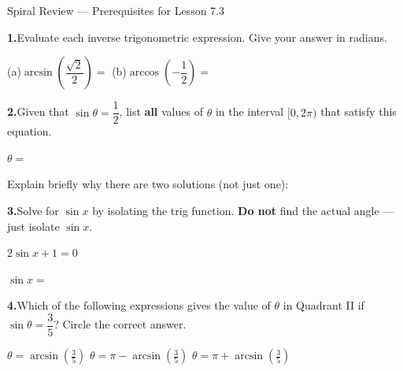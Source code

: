 \documentclass[10pt]{article}
\begin{document}
\namedateperiod

\vspace{0.10in}

\begin{notesbox}{Spiral Review --- Prerequisites for Lesson 7.3}

\textbf{1.}\quad Evaluate each inverse trigonometric expression.
Give your answer in radians.

\vspace{4pt}
(a)\quad $\arcsin\!\left(\dfrac{\sqrt{2}}{2}\right) = $ \blank{2.5cm}
\hspace{1cm}
(b)\quad $\arccos\!\left(-\dfrac{1}{2}\right) = $ \blank{2.5cm}

\vspace{0.14in}
\textbf{2.}\quad Given that $\sin\theta = \dfrac{1}{2}$, list \textbf{all}
values of $\theta$ in the interval $[0, 2\pi)$ that satisfy this equation.

\vspace{4pt}
$\theta = $ \blank{5cm}

\vspace{4pt}
Explain briefly why there are two solutions (not just one):

\vspace{0.14in}
\textbf{3.}\quad Solve for $\sin x$ by isolating the trig function.
\textbf{Do not} find the actual angle --- just isolate $\sin x$.

\vspace{4pt}
\hspace{1em}$2\sin x + 1 = 0$

\vspace{6pt}
$\sin x = $ \blank{3cm}

\vspace{0.14in}
\textbf{4.}\quad Which of the following expressions gives the value of
$\theta$ in Quadrant II if $\sin\theta = \dfrac{3}{5}$?
Circle the correct answer.

\vspace{4pt}
\hspace{2em}
$\displaystyle\theta = \arcsin\!\!\left(\tfrac{3}{5}\right)$
\hspace{2em}
$\displaystyle\theta = \pi - \arcsin\!\!\left(\tfrac{3}{5}\right)$
\hspace{2em}
$\displaystyle\theta = \pi + \arcsin\!\!\left(\tfrac{3}{5}\right)$

\end{notesbox}
\end{document}
